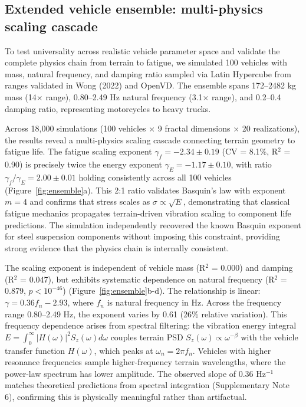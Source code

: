 \documentclass[11pt]{article}
\begin{document}
\subsection*{Extended vehicle ensemble: multi-physics scaling cascade}

To test universality across realistic vehicle parameter space and validate the complete physics chain from terrain to fatigue, we simulated 100 vehicles with mass, natural frequency, and damping ratio sampled via Latin Hypercube from ranges validated in Wong (2022)\cite{Wong2022} and OpenVD. The ensemble spans 172--2482 kg mass (14$\times$ range), 0.80--2.49 Hz natural frequency (3.1$\times$ range), and 0.2--0.4 damping ratio, representing motorcycles to heavy trucks.

Across 18,000 simulations (100 vehicles $\times$ 9 fractal dimensions $\times$ 20 realizations), the results reveal a multi-physics scaling cascade connecting terrain geometry to fatigue life. The fatigue scaling exponent $\gamma_f = -2.34 \pm 0.19$ (CV = 8.1\%, R$^2$ = 0.90) is precisely twice the energy exponent $\gamma_E = -1.17 \pm 0.10$, with ratio $\gamma_f / \gamma_E = 2.00 \pm 0.01$ holding consistently across all 100 vehicles (Figure~\ref{fig:ensemble}a). This 2:1 ratio validates Basquin's law with exponent $m = 4$ and confirms that stress scales as $\sigma \propto \sqrt{E}$, demonstrating that classical fatigue mechanics propagates terrain-driven vibration scaling to component life predictions. The simulation independently recovered the known Basquin exponent for steel suspension components without imposing this constraint, providing strong evidence that the physics chain is internally consistent.

The scaling exponent is independent of vehicle mass (R$^2$ = 0.000) and damping (R$^2$ = 0.047), but exhibits systematic dependence on natural frequency (R$^2$ = 0.879, $p < 10^{-46}$) (Figure~\ref{fig:ensemble}b-d). The relationship is linear: $\gamma = 0.36 f_n - 2.93$, where $f_n$ is natural frequency in Hz. Across the frequency range 0.80--2.49 Hz, the exponent varies by 0.61 (26\% relative variation). This frequency dependence arises from spectral filtering: the vibration energy integral $E = \int_0^\infty |H(\omega)|^2 S_z(\omega) d\omega$ couples terrain PSD $S_z(\omega) \propto \omega^{-\beta}$ with the vehicle transfer function $H(\omega)$, which peaks at $\omega_n = 2\pi f_n$. Vehicles with higher resonance frequencies sample higher-frequency terrain wavelengths, where the power-law spectrum has lower amplitude. The observed slope of 0.36 Hz$^{-1}$ matches theoretical predictions from spectral integration (Supplementary Note 6), confirming this is physically meaningful rather than artifactual.
\end{document}
